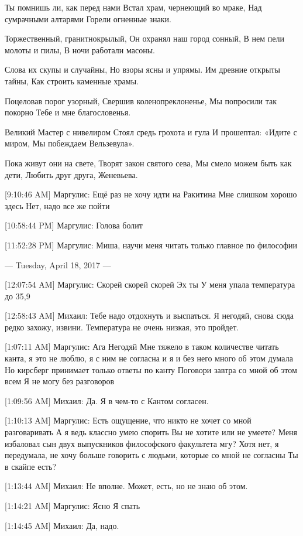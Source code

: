 \documentclass{article}
\begin{document}
Ты помнишь ли, как перед нами
Встал храм, чернеющий во мраке,
Над сумрачными алтарями
Горели огненные знаки.

Торжественный, гранитнокрылый,
Он охранял наш город сонный,
В нем пели молоты и пилы,
В ночи работали масоны.

Слова их скупы и случайны,
Но взоры ясны и упрямы.
Им древние открыты тайны,
Как строить каменные храмы.

Поцеловав порог узорный, 
Свершив коленопреклоненье,
Мы попросили так покорно
Тебе и мне благословенья.

Великий Мастер с нивелиром
Стоял средь грохота и гула
И прошептал: «Идите с миром,
Мы побеждаем Вельзевула».

Пока живут они на свете,
Творят закон святого сева,
Мы смело можем быть как дети,
Любить друг друга, Женевьева.

[9:10:46 AM] Маргулис:
Ещё раз не хочу идти на Ракитина
 Мне слишком хорошо здесь
 Нет, надо все же пойти

[10:58:44 PM] Маргулис:
Голова болит

[11:52:28 PM] Маргулис:
Миша, научи меня читать только главное по философии

--- Tuesday, April 18, 2017 ---

[12:07:54 AM] Маргулис:
Скорей скорей скорей
 Эх ты
 У меня упала температура до 35,9

[12:58:43 AM] Михаил:
Тебе надо отдохнуть и выспаться.
 Я негодяй, снова сюда редко захожу, извини.
 Температура не очень низкая, это пройдет.

[1:07:11 AM] Маргулис:
Ага
 Негодяй
 Мне тяжело в таком количестве читать канта, я это не люблю, я с ним  не согласна и я и без него много об этом думала
 Но кирсберг принимает только ответы по канту
 Поговори завтра со мной об этом всем
 Я не могу без разговоров

[1:09:56 AM] Михаил:
Да. Я в чем-то с Кантом согласен.

[1:10:13 AM] Маргулис:
Есть ощущение, что никто не хочет со мной разговаривать
 А я ведь классно умею спорить
 Вы не хотите или не умеете?
 Меня избаловал сын двух выпускников философского факультета мгу?
 Хотя нет, я передумала, не хочу больше говорить с людьми, которые со мной не согласны
 Ты в скайпе есть?

[1:13:44 AM] Михаил:
Не вполне.
 Может, есть, но не знаю об этом.

[1:14:21 AM] Маргулис:
Ясно
 Я спать

[1:14:45 AM] Михаил:
Да, надо.
\end{document}
